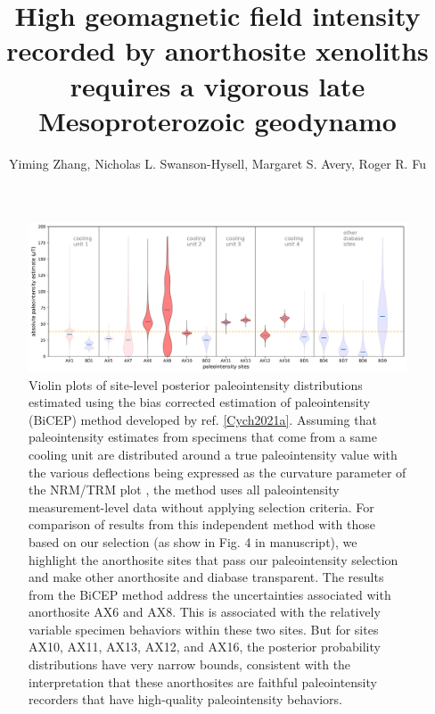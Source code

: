 \documentclass[9pt,twoside,lineno]{pnas-new}
\title{High geomagnetic field intensity recorded by anorthosite xenoliths requires a vigorous late Mesoproterozoic geodynamo}
\author{Yiming Zhang, Nicholas L. Swanson-Hysell, Margaret S. Avery, Roger R. Fu}
\begin{document}
\maketitle

\begin{figure}[h!]
\noindent\includegraphics[width=17.8 cm]{manuscript/PINT_BiCEP.pdf}
\centering
\caption{{Violin plots of site-level posterior paleointensity distributions estimated using the bias corrected estimation of paleointensity (BiCEP) method developed by ref. \ref{Cych2021a}. Assuming that paleointensity estimates from specimens that come from a same cooling unit are distributed around a true paleointensity value with the various deflections being expressed as the curvature parameter of the NRM/TRM plot \cite{Arai1963a, Paterson2011a}, the method uses all paleointensity measurement-level data without applying selection criteria. For comparison of results from this independent method with those based on our selection (as show in Fig. 4 in manuscript), we highlight the anorthosite sites that pass our paleointensity selection and make other anorthosite and diabase transparent. The results from the BiCEP method address the uncertainties associated with anorthosite AX6 and AX8. This is associated with the relatively variable specimen behaviors within these two sites. But for sites AX10, AX11, AX13, AX12, and AX16, the posterior probability distributions have very narrow bounds, consistent with the interpretation that these anorthosites are faithful paleointensity recorders that have high-quality paleointensity behaviors. }}
\label{fig:PINT_BiCEP}
\end{figure}

\clearpage
\end{document}
